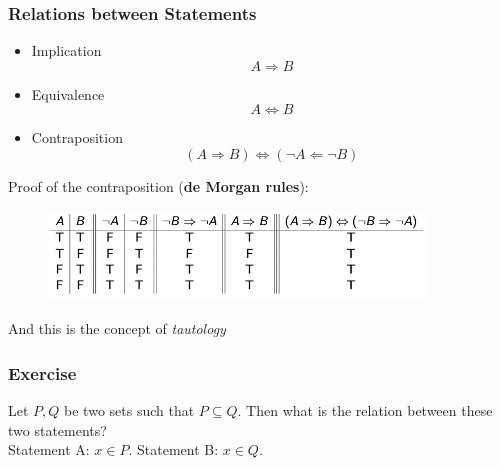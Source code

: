 \documentclass[12pt, t]{beamer}
\renewcommand{\emph}[1]{{\color{Turquoise3}\textsl{#1}}}
\begin{document}
\begin{frame}
    \frametitle{Relations between Statements}
    \begin{itemize}
        \item Implication
              \begin{equation*}
                  A \Rightarrow B
              \end{equation*}
        \item Equivalence
              \begin{equation*}
                  A \Leftrightarrow B
              \end{equation*}
        \item Contraposition
              \begin{equation*}
                  (A\Rightarrow B) \Leftrightarrow (\neg A \Leftarrow \neg B)
              \end{equation*}
    \end{itemize}
    Proof of the contraposition (\textbf{de Morgan rules}):
    \begin{figure}
        \centering
        \includegraphics[width=10cm]{Figures/TruthTable.png}
    \end{figure}
    And this is the concept of \emph{tautology}
\end{frame}


\begin{frame}
    \frametitle{Exercise}
    Let $P,Q$ be two sets such that $P \subseteq Q$. Then what is the relation between these
    two statements?
    \\ \center Statement A: $x \in P$. Statement B: $x \in Q$.

\end{frame}
\end{document}
